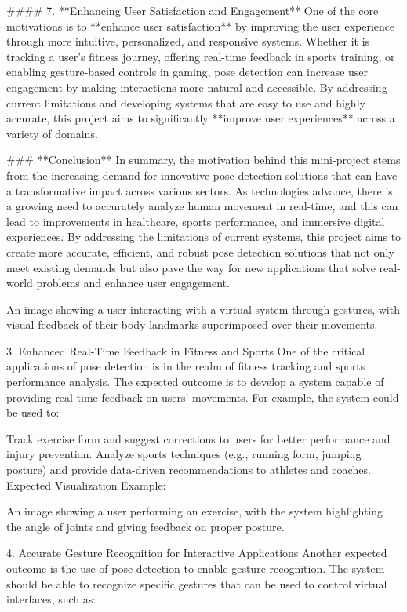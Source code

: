\documentclass[a4paper,12pt]{report}
\begin{document}
#### 7. **Enhancing User Satisfaction and Engagement**
   One of the core motivations is to **enhance user satisfaction** by improving the user experience through more intuitive, personalized, and responsive systems. Whether it is tracking a user’s fitness journey, offering real-time feedback in sports training, or enabling gesture-based controls in gaming, pose detection can increase user engagement by making interactions more natural and accessible. By addressing current limitations and developing systems that are easy to use and highly accurate, this project aims to significantly **improve user experiences** across a variety of domains.

### **Conclusion**
In summary, the motivation behind this mini-project stems from the increasing demand for innovative pose detection solutions that can have a transformative impact across various sectors. As technologies advance, there is a growing need to accurately analyze human movement in real-time, and this can lead to improvements in healthcare, sports performance, and immersive digital experiences. By addressing the limitations of current systems, this project aims to create more accurate, efficient, and robust pose detection solutions that not only meet existing demands but also pave the way for new applications that solve real-world problems and enhance user engagement.


An image showing a user interacting with a virtual system through gestures, with visual feedback of their body landmarks superimposed over their movements.

3. Enhanced Real-Time Feedback in Fitness and Sports
One of the critical applications of pose detection is in the realm of fitness tracking and sports performance analysis. The expected outcome is to develop a system capable of providing real-time feedback on users' movements. For example, the system could be used to:

Track exercise form and suggest corrections to users for better performance and injury prevention.
Analyze sports techniques (e.g., running form, jumping posture) and provide data-driven recommendations to athletes and coaches.
Expected Visualization Example:

An image showing a user performing an exercise, with the system highlighting the angle of joints and giving feedback on proper posture.

4. Accurate Gesture Recognition for Interactive Applications
Another expected outcome is the use of pose detection to enable gesture recognition. The system should be able to recognize specific gestures that can be used to control virtual interfaces, such as:
\end{document}
